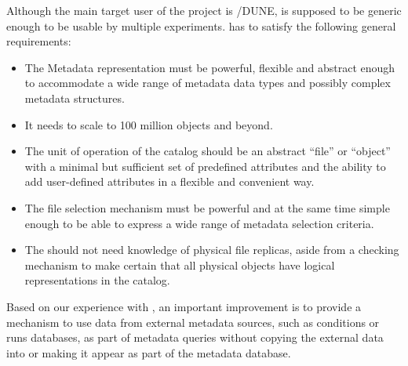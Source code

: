\documentclass[../main-v1.tex]{subfiles}
\begin{document}
Although the main target user of the project is /DUNE,  is supposed to be generic enough to be usable by multiple experiments.    has to satisfy the following general requirements: 

\begin{itemize} 
\item 
The Metadata representation must be powerful, flexible and abstract enough to accommodate a wide range of metadata data types and possibly complex metadata structures. 

\item
It needs to scale to 100 million objects and beyond. 

\item
The unit of operation of the catalog should be an abstract ``file'' or ``object'' with a  minimal but sufficient set of predefined   attributes and the ability to add user-defined   attributes in a flexible and convenient way. 

\item 
The file selection mechanism must be powerful and at the same time simple enough to be able to express a wide range of metadata selection criteria. 

\item 
The  should not need knowledge of physical file replicas, aside from a checking mechanism to make certain that all physical objects have logical representations in the catalog. 

\end{itemize} 
 

Based on our experience with , an important improvement is to provide a mechanism to use data from external metadata sources, such as conditions or runs databases, as part of metadata queries without copying the external data into or making it appear as part of the metadata database. 
\end{document}
